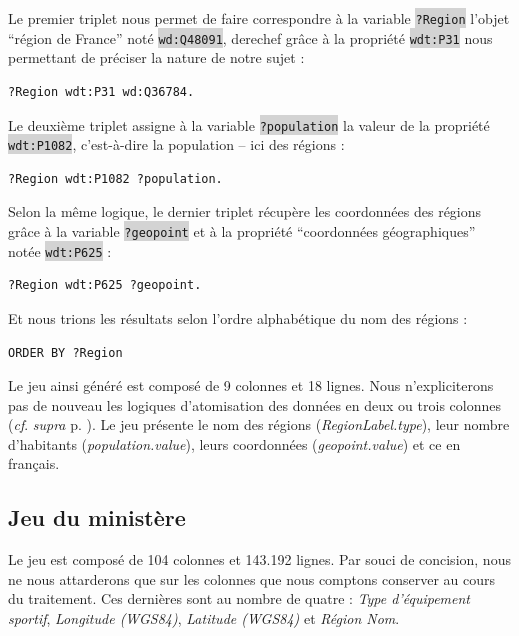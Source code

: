 \documentclass[hidelinks, 12pt]{report}
\newcommand{\code}[1]{\colorbox{LightGray}{\texttt{#1}}}
\begin{document}
Le premier triplet nous permet de faire correspondre à la variable \code{?Region} l'objet \enquote{région de France} noté \code{wd:Q48091}, derechef grâce à la propriété \code{wdt:P31} nous permettant de préciser la nature de notre sujet :

\begin{lstlisting}[language=SPARQL]
	?Region wdt:P31 wd:Q36784.
\end{lstlisting}

Le deuxième triplet assigne à la variable \code{?population} la valeur de la propriété \code{wdt:P1082}, c'est-à-dire la population -- ici des régions :

\begin{lstlisting}[language=SPARQL]
	?Region wdt:P1082 ?population.
\end{lstlisting}

Selon la même logique, le dernier triplet récupère les coordonnées des régions grâce à la variable \code{?geopoint} et à la propriété \enquote{coordonnées géographiques} notée \code{wdt:P625} :

\begin{lstlisting}[language=SPARQL]
	?Region wdt:P625 ?geopoint.
\end{lstlisting}

Et nous trions les résultats selon l'ordre alphabétique du nom des régions :

\begin{lstlisting}[language=SPARQL]
	ORDER BY ?Region
\end{lstlisting}

Le jeu ainsi généré est composé de 9 colonnes et 18 lignes. Nous n'expliciterons pas de nouveau les logiques d'atomisation des données en deux ou trois colonnes (\textit{cf}. \textit{supra} p. \pageref{query1tab}). Le jeu présente le nom des régions (\textit{RegionLabel.type}), leur nombre d'habitants (\textit{population.value}), leurs coordonnées (\textit{geopoint.value}) et ce en français.





%





\subsection{Jeu du ministère}

Le jeu est composé de 104 colonnes et 143.192 lignes. Par souci de concision, nous ne nous attarderons que sur les colonnes que nous comptons conserver au cours du traitement. Ces dernières sont au nombre de quatre : \textit{Type d'équipement sportif}, \textit{Longitude (WGS84)}, \textit{Latitude (WGS84)} et \textit{Région Nom}.
\end{document}
